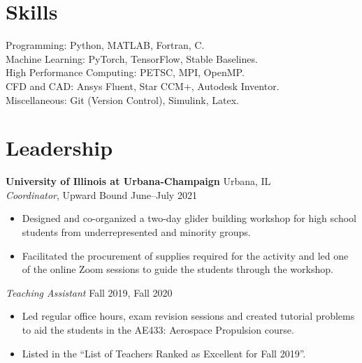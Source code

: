 \documentclass[margin]{res}
\begin{document}
\begin{resume}

\section{\large Skills}		 
Programming: Python, MATLAB, Fortran, C.\\
Machine Learning: PyTorch, TensorFlow, Stable Baselines.\\
High Performance Computing: PETSC, MPI, OpenMP.\\
CFD and CAD: Ansys Fluent, Star CCM+, Autodesk Inventor.\\ 
Miscellaneous: Git (Version Control), Simulink, Latex.

\section{\large Leadership}
{\bf University of Illinois at Urbana-Champaign} \hfill Urbana, IL\\
{\it Coordinator}, Upward Bound \hfill June--July 2021
\begin{itemize}
	\item Designed and co-organized a two-day glider building workshop for high school students from underrepresented and minority groups.
	\item Facilitated the procurement of supplies required for the activity and led one of the online Zoom sessions to guide the students through the workshop.
\end{itemize}

{\it Teaching Assistant} \hfill Fall 2019, Fall 2020
\begin{itemize}
	\item Led regular office hours, exam revision sessions and created tutorial problems to aid the students in the AE433: Aerospace Propulsion course.
	\item Listed in the ``List of Teachers Ranked as Excellent for Fall 2019''.
\end{itemize}



\end{resume}
\end{document}
